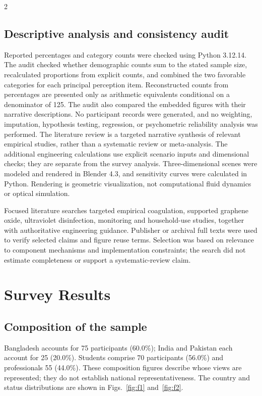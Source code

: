 \documentclass{ieeeaccess}
\begin{document}
\begin{multicols}{2}
\subsection{Descriptive analysis and consistency audit}

Reported percentages and category counts were checked using Python 3.12.14. The audit checked whether demographic counts sum to the stated sample size, recalculated proportions from explicit counts, and combined the two favorable categories for each principal perception item. Reconstructed counts from percentages are presented only as arithmetic equivalents conditional on a denominator of 125. The audit also compared the embedded figures with their narrative descriptions. No participant records were generated, and no weighting, imputation, hypothesis testing, regression, or psychometric reliability analysis was performed. The literature review is a targeted narrative synthesis of relevant empirical studies, rather than a systematic review or meta-analysis. The additional engineering calculations use explicit scenario inputs and dimensional checks; they are separate from the survey analysis. Three-dimensional scenes were modeled and rendered in Blender 4.3, and sensitivity curves were calculated in Python. Rendering is geometric visualization, not computational fluid dynamics or optical simulation.

Focused literature searches targeted empirical coagulation, supported graphene oxide, ultraviolet disinfection, monitoring and household-use studies, together with authoritative engineering guidance. Publisher or archival full texts were used to verify selected claims and figure reuse terms. Selection was based on relevance to component mechanisms and implementation constraints; the search did not estimate completeness or support a systematic-review claim.



\section{Survey Results}

\subsection{Composition of the sample}

Bangladesh accounts for 75 participants (60.0\%); India and Pakistan each account for 25 (20.0\%). Students comprise 70 participants (56.0\%) and professionals 55 (44.0\%). These composition figures describe whose views are represented; they do not establish national representativeness. The country and status distributions are shown in Figs.~\ref{fig:f1} and~\ref{fig:f2}.


\end{multicols}
\end{document}
